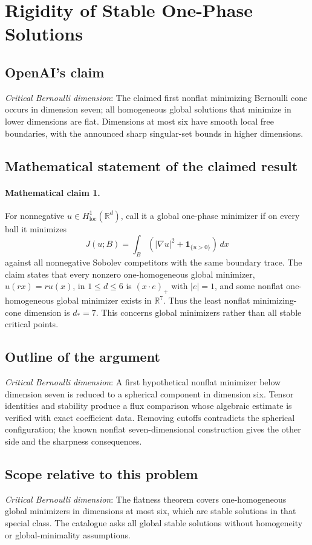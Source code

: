 \documentclass[11pt]{article}
\begin{document}
\section*{Rigidity of Stable One-Phase Solutions}

\subsection{OpenAI's claim}
\textit{Critical Bernoulli dimension}: The claimed first nonflat minimizing Bernoulli cone occurs in dimension seven; all homogeneous global solutions that minimize in lower dimensions are flat. Dimensions at most six have smooth local free boundaries, with the announced sharp singular-set bounds in higher dimensions.

\subsection{Mathematical statement of the claimed result}
\paragraph{Mathematical claim 1.} For nonnegative $u\in H^1_{\mathrm{loc}}(\mathbb R^d)$, call it a global one-phase minimizer if on every ball it minimizes \[J(u;B)=\int_B(|\nabla u|^2+\mathbf1_{\{u>0\}})\,dx\] against all nonnegative Sobolev competitors with the same boundary trace. The claim states that every nonzero one-homogeneous global minimizer, $u(rx)=ru(x)$, in $1\le d\le6$ is $(x\cdot e)_+$ with $|e|=1$, and some nonflat one-homogeneous global minimizer exists in $\mathbb R^7$. Thus the least nonflat minimizing-cone dimension is $d_*=7$. This concerns global minimizers rather than all stable critical points.

\subsection{Outline of the argument}
\textit{Critical Bernoulli dimension}: A first hypothetical nonflat minimizer below dimension seven is reduced to a spherical component in dimension six. Tensor identities and stability produce a flux comparison whose algebraic estimate is verified with exact coefficient data. Removing cutoffs contradicts the spherical configuration; the known nonflat seven-dimensional construction gives the other side and the sharpness consequences.

\subsection{Scope relative to this problem}
\textit{Critical Bernoulli dimension}: The flatness theorem covers one-homogeneous global minimizers in dimensions at most six, which are stable solutions in that special class. The catalogue asks all global stable solutions without homogeneity or global-minimality assumptions.
\end{document}
